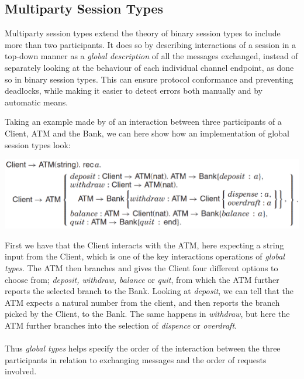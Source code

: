 
\subsection{Multiparty Session Types}
Multiparty session types extend the theory of binary session types to include more than two participants. It does so by describing interactions of a session in a top-down manner as a \textit{global description} of all the messages exchanged, instead of separately looking at the behaviour of each individual channel endpoint, as done so in binary session types. This can ensure protocol conformance and preventing deadlocks, while making it easier to detect errors both manually and by automatic means.  %

Taking an example made by \citeauthor{DBLP:journals/csur/HuttelLVCCDMPRT16} of an interaction between three participants of a Client, ATM and the Bank, we can here show how an implementation of global session types look:
\begin{center}
\includegraphics[width=1.0\textwidth, angle=0]{Graphics/Client_ATM.pdf}
\end{center}
First we have that the Client interacts with the ATM, here expecting a string input from the Client, which is one of the key interactions operations of \textit{global types}. The ATM then branches and gives the Client four different options to choose from; \textit{deposit, withdraw, balance} or \textit{quit}, from which the ATM further reports the selected branch to the Bank. Looking at \textit{deposit}, we can tell that the ATM expects a natural number from the client, and then reports the branch picked by the Client, to the Bank. The same happens in \textit{withdraw}, but here the ATM further branches into the selection of \textit{dispence} or \textit{overdraft}.
\\ \\
Thus \textit{global types} helps specify the order of the interaction between the three participants in relation to exchanging messages and the order of requests involved.  

